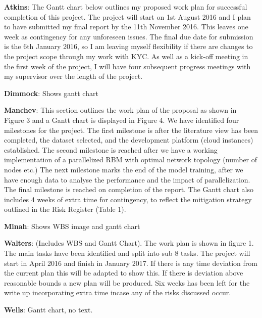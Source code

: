 \textbf{Atkins}: The Gantt chart below outlines my proposed work plan for successful completion of this project. The project will start on 1st August 2016 and I
plan to have submitted my final report by the 11th November 2016. This leaves one week as contingency for any unforeseen issues. The final due
date for submission is the 6th January 2016, so I am leaving myself flexibility if there are changes to the project scope through my work with
KYC.
As well as a kick-off meeting in the first week of the project, I will have four subsequent progress meetings with my supervisor over the length
of the project. 

\textbf{Dimmock}: Shows gantt chart

\textbf{Manchev}: This section outlines the work plan of the proposal as shown in Figure 3 and a Gantt chart is
displayed in Figure 4.
We have identified four milestones for the project. The first milestone is after the literature
view has been completed, the dataset selected, and the development platform (cloud instances)
established. The second milestone is reached after we have a working implementation of a
parallelized RBM with optimal network topology (number of nodes etc.) The next milestone
marks the end of the model training, after we have enough data to analyse the performance and
the impact of parallelization. The final milestone is reached on completion of the report.
The Gantt chart also includes 4 weeks of extra time for contingency, to reflect the mitigation
strategy outlined in the Risk Register (Table 1).

\textbf{Minah}: Shows WBS image and gantt chart

\textbf{Walters}: (Includes WBS and Gantt Chart). The work plan is shown in figure 1. The main tasks have been identified and split into sub
8
tasks. The project will start in April 2016 and finish in January 2017. If there is any time
deviation from the current plan this will be adapted to show this. If there is deviation above
reasonable bounds a new plan will be produced. Six weeks has been left for the write up
incorporating extra time incase any of the risks discussed occur.

\textbf{Wells}: Gantt chart, no text.